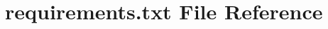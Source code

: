 \hypertarget{requirements_8txt}{}\section{requirements.\+txt File Reference}
\label{requirements_8txt}
